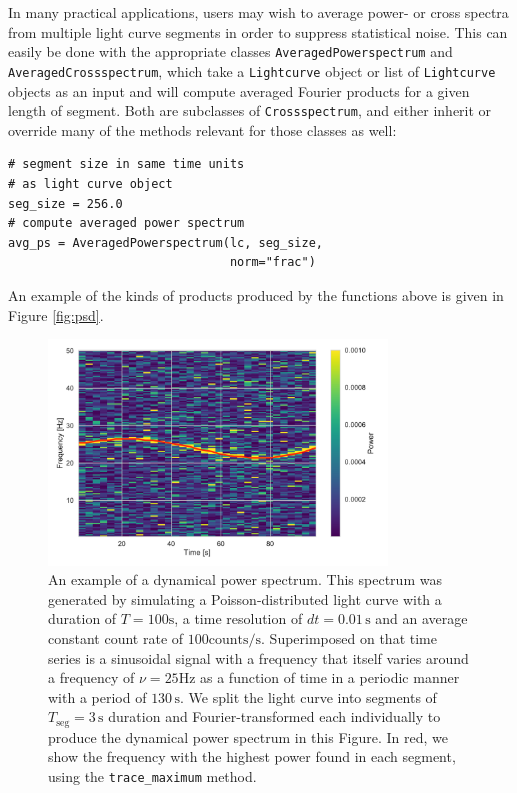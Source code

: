 \documentclass[12pt]{emulateapj}
\newcommand{\lightcurve}{\texttt{Lightcurve}\xspace}
\newcommand{\crossspectrum}{\texttt{Crossspectrum}\xspace}
\begin{document}
In many practical applications, users may wish to average power- or cross spectra from multiple light curve segments in order to suppress statistical noise. This can easily be done with the appropriate classes \texttt{AveragedPowerspectrum} and \texttt{AveragedCrossspectrum}, which take a \lightcurve object or list of \lightcurve objects as an input and will compute averaged Fourier products for a given length of segment. Both are subclasses of \crossspectrum, and either inherit or override many of the methods relevant for those classes as well:

\begin{verbatim}
# segment size in same time units 
# as light curve object
seg_size = 256.0
# compute averaged power spectrum
avg_ps = AveragedPowerspectrum(lc, seg_size, 
                               norm="frac")
\end{verbatim}

\noindent An example of the kinds of products produced by the functions above is given in Figure \ref{fig:psd}.

\begin{figure}[htbp]
\begin{center}
\includegraphics[width=9cm]{dyn_spec.pdf}
\caption{An example of a dynamical power spectrum. This spectrum was generated by simulating a Poisson-distributed light curve with a duration of $T=100 \mathrm{s}$, a time resolution of $dt = 0.01\,\mathrm{s}$ and an average constant count rate of $100\mathrm{counts/s}$. Superimposed on that time series is a sinusoidal signal with a frequency that itself varies around a frequency of $\nu = 25\mathrm{Hz}$ as a function of time in a periodic manner with a period of $130\,\mathrm{s}$. We split the light curve into segments of $T_\mathrm{seg} = 3\,\mathrm{s}$ duration and Fourier-transformed each individually to produce the dynamical power spectrum in this Figure. In red, we show the frequency with the highest power found in each segment, using the \texttt{trace_maximum} method.}
\label{fig:dynspec}
\end{center}
\end{figure}
\end{document}
